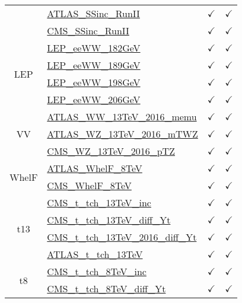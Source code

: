 \documentclass{article}
\begin{document}
\begin{table}[H]
\begin{tabular}{|c|l|c|c|}
 & \href{https://arxiv.org/abs/1909.02845}{ATLAS_SSinc_RunII}  & $\checkmark$ & $\checkmark$\\ \cline{2-4}
 & \href{https://arxiv.org/abs/1809.10733}{CMS_SSinc_RunII}  & $\checkmark$ & $\checkmark$
\\ \hline
\multirow{4}{*}{LEP}
 & \href{https://arxiv.org/abs/1302.3415}{LEP_eeWW_182GeV}  & $\checkmark$ & $\checkmark$\\ \cline{2-4}
 & \href{https://arxiv.org/abs/1302.3415}{LEP_eeWW_189GeV}  & $\checkmark$ & $\checkmark$\\ \cline{2-4}
 & \href{https://arxiv.org/abs/1302.3415}{LEP_eeWW_198GeV}  & $\checkmark$ & $\checkmark$\\ \cline{2-4}
 & \href{https://arxiv.org/abs/1302.3415}{LEP_eeWW_206GeV}  & $\checkmark$ & $\checkmark$
\\ \hline
\multirow{3}{*}{VV}
 & \href{https://arxiv.org/abs/1905.04242}{ATLAS_WW_13TeV_2016_memu}  & $\checkmark$ & $\checkmark$\\ \cline{2-4}
 & \href{https://arxiv.org/abs/1902.05759}{ATLAS_WZ_13TeV_2016_mTWZ}  & $\checkmark$ & $\checkmark$\\ \cline{2-4}
 & \href{https://arxiv.org/abs/1901.03428}{CMS_WZ_13TeV_2016_pTZ}  & $\checkmark$ & $\checkmark$
\\ \hline
\multirow{2}{*}{WhelF}
 & \href{https://arxiv.org/abs/1612.02577}{ATLAS_WhelF_8TeV}  & $\checkmark$ & $\checkmark$\\ \cline{2-4}
 & \href{https://arxiv.org/abs/1605.09047}{CMS_WhelF_8TeV}  & $\checkmark$ & $\checkmark$
\\ \hline
\multirow{4}{*}{t13}
 & \href{https://arxiv.org/abs/1610.00678}{CMS_t_tch_13TeV_inc}  & $\checkmark$ & $\checkmark$\\ \cline{2-4}
 & \href{https://cds.cern.ch/record/2151074}{CMS_t_tch_13TeV_diff_Yt}  & $\checkmark$ & $\checkmark$\\ \cline{2-4}
 & \href{https://arxiv.org/abs/1907.08330}{CMS_t_tch_13TeV_2016_diff_Yt}  & $\checkmark$ & $\checkmark$\\ \cline{2-4}
 & \href{https://arxiv.org/abs/1609.03920}{ATLAS_t_tch_13TeV}  & $\checkmark$ & $\checkmark$
\\ \hline
\multirow{5}{*}{t8}
 & \href{https://arxiv.org/abs/1403.7366}{CMS_t_tch_8TeV_inc}  & $\checkmark$ & $\checkmark$\\ \cline{2-4}
 & \href{https://cds.cern.ch/record/1956681}{CMS_t_tch_8TeV_diff_Yt}  & $\checkmark$ & $\checkmark$\\ \cline{2-4}

\end{tabular}
\end{table}
\end{document}
